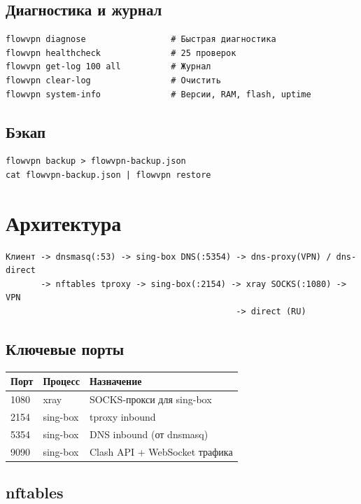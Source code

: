 \documentclass[11pt,a4paper]{article}
\begin{document}
\subsection{Диагностика и журнал}

\begin{lstlisting}
flowvpn diagnose                 # Быстрая диагностика
flowvpn healthcheck              # 25 проверок
flowvpn get-log 100 all          # Журнал
flowvpn clear-log                # Очистить
flowvpn system-info              # Версии, RAM, flash, uptime
\end{lstlisting}

\subsection{Бэкап}

\begin{lstlisting}
flowvpn backup > flowvpn-backup.json
cat flowvpn-backup.json | flowvpn restore
\end{lstlisting}

\section{Архитектура}

\begin{lstlisting}
Клиент -> dnsmasq(:53) -> sing-box DNS(:5354) -> dns-proxy(VPN) / dns-direct
       -> nftables tproxy -> sing-box(:2154) -> xray SOCKS(:1080) -> VPN
                                              -> direct (RU)
\end{lstlisting}

\subsection{Ключевые порты}

\begin{tabularx}{\textwidth}{l l X}
\toprule
\textbf{Порт} & \textbf{Процесс} & \textbf{Назначение} \\
\midrule
1080 & xray & SOCKS-прокси для sing-box \\
2154 & sing-box & tproxy inbound \\
5354 & sing-box & DNS inbound (от dnsmasq) \\
9090 & sing-box & Clash API + WebSocket трафика \\
\bottomrule
\end{tabularx}

\subsection{nftables}
\end{document}
